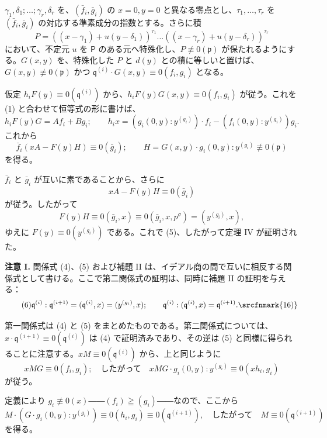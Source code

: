 \(\gamma_1,\delta_1;\ldots;\gamma_r,\delta_r\) を、\((\bar f_i,\bar g_i)\) の \(x=0, y=0\) と異なる零点とし、\(\tau_1,\ldots,\tau_r\) を \((\bar f_i,\bar g_i)\) の対応する準素成分の指数とする。さらに積
\[
P=((x-\gamma_1)+u(y-\delta_1))^{\tau_1}\ldots
((x-\gamma_r)+u(y-\delta_r))^{\tau_r}
\]
において、不定元 \(u\) を \(\mathsf P\) のある元へ特殊化し、\(P\not\equiv0(\mathfrak{p})\) が保たれるようにする。\(G(x,y)\) を、特殊化した \(P\) と \(d(y)\) との積に等しいと置けば、\(G(x,y)\not\equiv0(\mathfrak{p})\) かつ \(\mathfrak{q}^{(i)}\cdot G(x,y)\equiv0(f_i,g_i)\) となる。

仮定 \(h_iF(y)\equiv0(\mathfrak{q}^{(i)})\) から、\(h_iF(y)G(x,y)\equiv0(f_i,g_i)\) が従う。これを (1) と合わせて恒等式の形に書けば、
\[
h_iF(y)G=A f_i+B g_i;\qquad
h_ix=(g_i(0,y):y^{(g_i)})\cdot f_i
-(f_i(0,y):y^{(g_i)})g_i.
\]
これから
\[
\bar f_i(xA-F(y)H)\equiv0(\bar g_i);\qquad
H=G(x,y)\cdot g_i(0,y):y^{(g_i)}\not\equiv0(\mathfrak{p})
\]
を得る。

\(\bar f_i\) と \(\bar g_i\) が互いに素であることから、さらに
\[
xA-F(y)H\equiv0(\bar g_i)
\]
が従う。したがって
\[
F(y)H\equiv0(\bar g_i,x)
\equiv0(\bar g_i,x,p^\sigma)=(y^{(g_i)},x),
\]
ゆえに \(F(y)\equiv0(y^{(g_i)})\) である。これで (5)、したがって定理 IV が証明された。

\textbf{注意 I.} 関係式 (4)、(5) および補題 II は、イデアル商の間で互いに相反する関係式として書ける。ここで第二関係式の証明は、同時に補題 II の証明を与える：
\begin{equation}
\tag{6}
\mathfrak{q}^{(i)}:\mathfrak{q}^{(i+1)}=(\mathfrak{q}^{(i)},x)=(y^{(g_i)},x);\qquad
\mathfrak{q}^{(i)}:(\mathfrak{q}^{(i)},x)=\mathfrak{q}^{(i+1)}.\srcfnmark{16)}
\end{equation}

第一関係式は (4) と (5) をまとめたものである。第二関係式については、\(x\cdot \mathfrak{q}^{(i+1)}\equiv0(\mathfrak{q}^{(i)})\) は (4) で証明済みであり、その逆は (5) と同様に得られることに注意する。\(xM\equiv0(\mathfrak{q}^{(i)})\) から、上と同じように
\[
xMG\equiv0(f_i,g_i);\quad\text{したがって}\quad
xMG\cdot g_i(0,y):y^{(g_i)}\equiv0(xh_i,g_i)
\]
が従う。

定義により \(g_i\not\equiv0(x)\)――\((f_i)\geqq(g_i)\)――なので、ここから
\[
M\cdot(G\cdot g_i(0,y):y^{(g_i)})
\equiv0(h_i,g_i)\equiv0(\mathfrak{q}^{(i+1)}),
\quad\text{したがって}\quad M\equiv0(\mathfrak{q}^{(i+1)})
\]
を得る。

